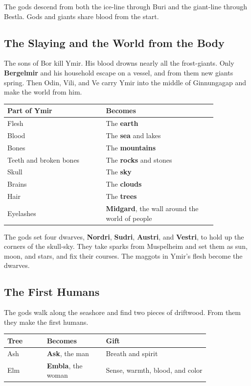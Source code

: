 The gods descend from both the ice-line through Buri and the giant-line through Bestla. Gods and giants share blood from the start.

\subsection{The Slaying and the World from the Body}

The sons of Bor kill Ymir. His blood drowns nearly all the frost-giants. Only \textbf{Bergelmir} and his household escape on a vessel, and from them new giants spring. Then Odin, Vili, and Ve carry Ymir into the middle of Ginnungagap and make the world from him.

\begin{longtable}{L{0.4\linewidth}
L{0.45\linewidth}}
\toprule
\textbf{Part of Ymir} & \textbf{Becomes} \\
\midrule
Flesh & The \textbf{earth} \\
Blood & The \textbf{sea} and lakes \\
Bones & The \textbf{mountains} \\
Teeth and broken bones & The \textbf{rocks} and stones \\
Skull & The \textbf{sky} \\
Brains & The \textbf{clouds} \\
Hair & The \textbf{trees} \\
Eyelashes & \textbf{Midgard}, the wall around the world of people \\
\bottomrule
\end{longtable}

The gods set four dwarves, \textbf{Nordri}, \textbf{Sudri}, \textbf{Austri}, and \textbf{Vestri}, to hold up the corners of the skull-sky. They take sparks from Muspelheim and set them as sun, moon, and stars, and fix their courses. The maggots in Ymir's flesh become the dwarves.

\subsection{The First Humans}

The gods walk along the seashore and find two pieces of driftwood. From them they make the first humans.

\begin{longtable}{L{0.16\linewidth}
L{0.24\linewidth} L{0.42\linewidth}}
\toprule
\textbf{Tree} & \textbf{Becomes} & \textbf{Gift} \\
\midrule
Ash & \textbf{Ask}, the man & Breath and spirit \\
Elm & \textbf{Embla}, the woman & Sense, warmth, blood, and color \\
\bottomrule
\end{longtable}

